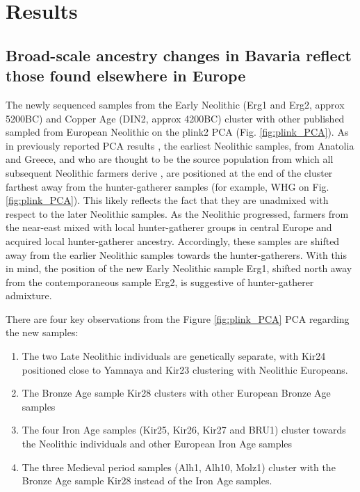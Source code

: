 \section{Results}

\subsection{Broad-scale ancestry changes in Bavaria reflect those found elsewhere in Europe}

The newly sequenced samples from the Early Neolithic (Erg1 and Erg2, approx 5200BC) and Copper Age (DIN2, approx 4200BC) cluster with other published sampled from European Neolithic on the plink2 PCA (Fig. \ref{fig:plink_PCA}). As in previously reported PCA results \cite{Lipson2017b}, the earliest Neolithic samples, from Anatolia and Greece, and who are thought to be the source population from which all subsequent Neolithic farmers derive \cite{Hofmanova2016, Haak2010, haak2005ancient, bramanti2009genetic, Lazaridis2014}, are  positioned at the end of the cluster farthest away from the hunter-gatherer samples (for example, WHG on Fig. \ref{fig:plink_PCA}). This likely reflects the fact that they are unadmixed with respect to the later Neolithic samples. As the Neolithic progressed, farmers from the near-east mixed with local hunter-gatherer groups in central Europe \cite{Lipson2017b} and acquired local hunter-gatherer ancestry. Accordingly, these samples are shifted away from the earlier Neolithic samples towards the hunter-gatherers. With this in mind, the position of the new Early Neolithic sample Erg1, shifted north away from the contemporaneous sample Erg2, is suggestive of hunter-gatherer admixture. 

There are four key observations from the Figure \ref{fig:plink_PCA} PCA regarding the new samples:

\begin{enumerate}
\item The two Late Neolithic individuals are genetically separate, with Kir24 positioned close to Yamnaya and Kir23 clustering with Neolithic Europeans.
\item The Bronze Age sample Kir28 clusters with other European Bronze Age samples
\item The four Iron Age samples (Kir25, Kir26, Kir27 and BRU1) cluster towards the Neolithic individuals and other European Iron Age samples
\item The three Medieval period samples (Alh1, Alh10, Molz1) cluster with the Bronze Age sample Kir28 instead of the Iron Age samples.
\end{enumerate}

